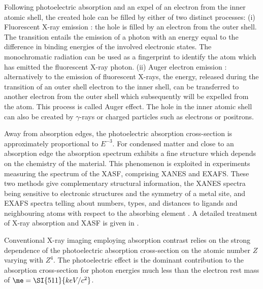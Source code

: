 \documentclass[
twoside,
openright,
titlepage,
numbers=noenddot,
headinclude,
fleqn,
a4paper,
footinclude=true,
cleardoublepage=empty,
abstractoff,
BCOR=5mm,
paper=a4,
fontsize=11pt,
british,ngerman,american,
]{scrreprt}
\begin{document}
Following photoelectric absorption and an expel of an electron from
the inner atomic shell, the created hole can be filled by either of
two distinct processes: (i) Fluorescent X-ray emission
\cite{Barkla1904}: the hole is filled by an electron from the outer
shell.  The transition entails the emission of a photon with an energy
equal to the difference in binding energies of the involved electronic
states.  The monochromatic radiation can be used as a fingerprint to
identify the atom which has emitted the fluorescent X-ray photon. (ii)
Auger electron emission \cite{Meitner1922}: alternatively to the
emission of fluorescent X-rays, the energy, released during the
transition of an outer shell electron to the inner shell, can be
transferred to another electron from the outer shell which
subsequently will be expelled from the atom.  This process is called
Auger effect.  The hole in the inner atomic shell can also be created
by $\gamma$-rays or charged particles such as electrons or positrons.

Away from absorption edges, the photoelectric absorption cross-section
is approximately proportional to $E^{-3}$.  For condensed matter and
close to an absorption edge the absorption spectrum exhibits a fine
structure which depends on the chemistry of the material.  This
phenomenon is exploited in experiments measuring the spectrum of the
\acf{XASF}, comprising \acf{XANES} and \acf{EXAFS}.  These two methods
give complementary structural information, the \ac{XANES} spectra
being sensitive to electronic structures and the symmetry of a metal
site, and \ac{EXAFS} spectra telling about numbers, types, and
distances to ligands and neighbouring atoms with respect to the
absorbing element \cite{KoningsbergerPrins}.
%
A detailed treatment of X-ray absorption and \ac{XASF} is given in
\cite{KoningsbergerPrins}.

Conventional X-ray imaging employing absorption contrast relies on the
strong dependence of the photoelectric absorption cross-section on the
atomic number $Z$ varying with $Z^4$.  The photoelectric effect is the
dominant contribution to the absorption cross-section for photon
energies much less than the electron rest mass of
$\me=\SI{511}{keV/c^2}$.
\end{document}
